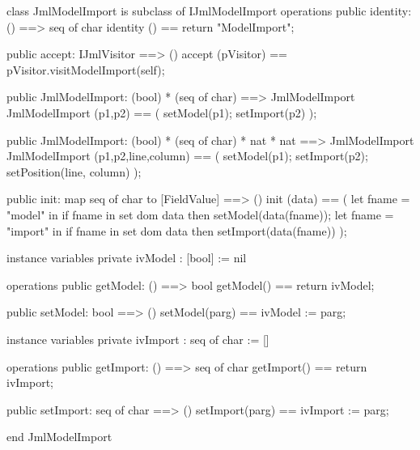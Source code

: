 \begin{vdm_al}
class JmlModelImport is subclass of IJmlModelImport
operations
  public identity: () ==> seq of char
  identity () == return "ModelImport";

  public accept: IJmlVisitor ==> ()
  accept (pVisitor) == pVisitor.visitModelImport(self);

  public JmlModelImport:
    (bool) *
    (seq of char) ==> JmlModelImport
  JmlModelImport (p1,p2) == 
    ( setModel(p1);
      setImport(p2) );

  public JmlModelImport:
    (bool) *
    (seq of char) *
    nat *
    nat ==> JmlModelImport
  JmlModelImport (p1,p2,line,column) == 
    ( setModel(p1);
      setImport(p2);
      setPosition(line, column) );

  public init: map seq of char to [FieldValue] ==> ()
  init (data) ==
    ( let fname = "model" in
        if fname in set dom data
        then setModel(data(fname));
      let fname = "import" in
        if fname in set dom data
        then setImport(data(fname)) );

instance variables
  private ivModel : [bool] := nil

operations
  public getModel: () ==> bool
  getModel() == return ivModel;

  public setModel: bool ==> ()
  setModel(parg) == ivModel := parg;

instance variables
  private ivImport : seq of char := []

operations
  public getImport: () ==> seq of char
  getImport() == return ivImport;

  public setImport: seq of char ==> ()
  setImport(parg) == ivImport := parg;

end JmlModelImport
\end{vdm_al}

